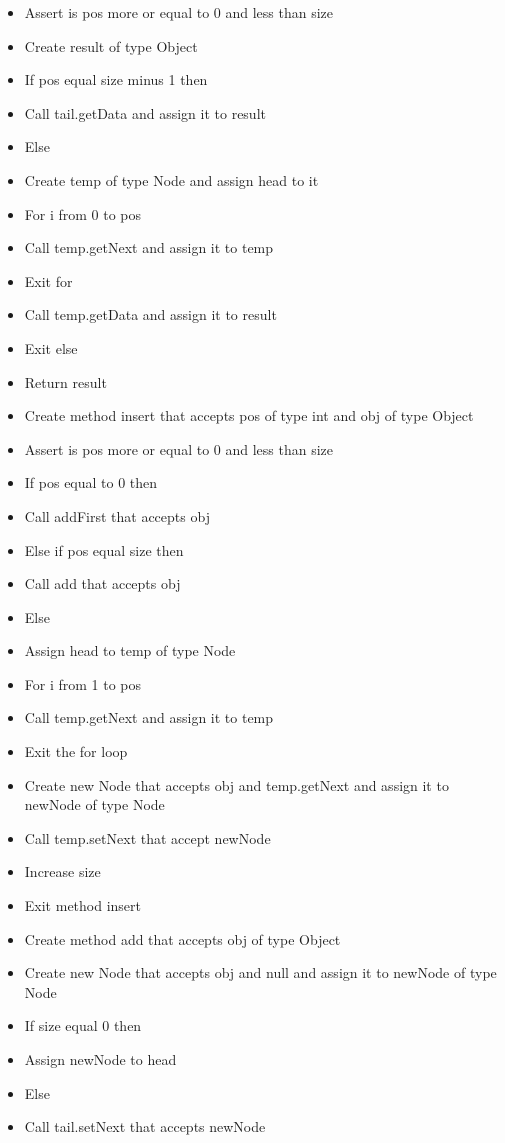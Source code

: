 \begin{itemize}
	\item Assert is pos more or equal to 0 and less than size
	\item Create result of type Object
	\item If pos equal size minus 1 then
	\item Call tail.getData and assign it to result
	\item Else
	\item Create temp of type Node and assign head to it
	\item For i from 0 to pos
	\item Call temp.getNext and assign it to temp
	\item Exit for
	\item Call temp.getData and assign it to result
	\item Exit else
	\item Return result
	\item Create method insert that accepts pos of type int and obj of type Object
	\item Assert is pos more or equal to 0 and less than size
	\item If pos equal to 0 then
	\item Call addFirst that accepts obj
	\item Else if pos equal size then
	\item Call add that accepts obj
	\item Else
	\item Assign head to temp of type Node
	\item For i from 1 to pos
	\item Call temp.getNext and assign it to temp
	\item Exit the for loop
	\item Create new Node that accepts obj and temp.getNext and assign it to newNode of type Node
	\item Call temp.setNext that accept newNode
	\item Increase size
	\item Exit method insert
	\item Create method add that accepts obj of type Object
	\item Create new Node that accepts obj and null and assign it to newNode of type Node
	\item If size equal 0 then
	\item Assign newNode to head
	\item Else
	\item Call tail.setNext that accepts newNode

\end{itemize}
